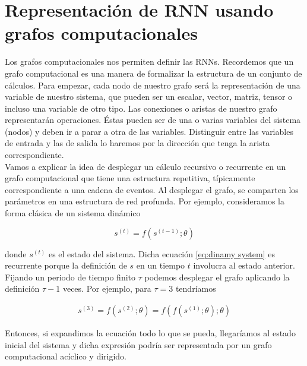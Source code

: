     \section{Representación de RNN usando grafos computacionales}
        
    Los grafos computacionales nos permiten definir las RNNs. Recordemos que un grafo computacional es una manera de formalizar la estructura de un conjunto de cálculos. Para empezar, cada nodo de nuestro grafo será la representación de una variable de nuestro sistema, que pueden ser un escalar, vector, matriz, tensor o incluso una variable de otro tipo. Las conexiones o aristas de nuestro grafo representarán operaciones. Éstas pueden ser de una o varias variables del sistema (nodos) y deben ir a parar a otra de las variables. Distinguir entre las variables de entrada y las de salida lo haremos por la dirección que tenga la arista correspondiente. \\
    
    
    Vamos a explicar la idea de desplegar un cálculo recursivo o recurrente en un grafo computacional que tiene una estructura repetitiva, típicamente correspondiente a una cadena de eventos. Al desplegar el grafo, se comparten los parámetros en una estructura de red profunda. Por ejemplo, consideramos la forma clásica de un sistema dinámico
        
        \begin{equation}\label{eq:dinamy system}
                s^{(t)} = f(s^{(t-1)};\theta)
        \end{equation}
        
    \noindent donde $ s^{(t)}$ es el estado del sistema. Dicha ecuación \eqref{eq:dinamy system} es recurrente porque la definición de $s$ en un tiempo $t$ involucra al estado anterior. Fijando un periodo de tiempo finito $\tau$ podemos desplegar el grafo aplicando la definición $\tau - 1$ veces. Por ejemplo, para $\tau = 3$ tendríamos
        
        \begin{equation}
            \begin{aligned}
                s^{(3)} = f(s^{(2)}; \theta) = f(f(s^{(1)};\theta);\theta)
            \end{aligned}
        \end{equation}


    \noindent Entonces, si expandimos la ecuación todo lo que se pueda, llegaríamos al estado inicial del sistema y dicha expresión podría ser representada por un grafo computacional acíclico y dirigido.\\  
    
